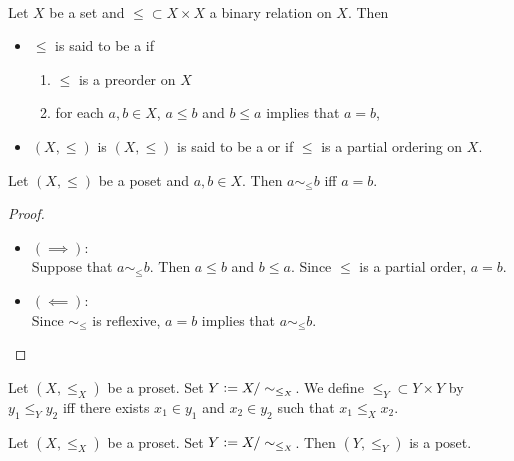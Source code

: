 \documentclass{book}
\begin{document}
	\begin{defn}   \\
		Let $X$ be a set and ${\leq}  \subset X \times X$ a binary relation on $X$. Then 
		\begin{itemize}
			\item $\leq$ is said to be a  if 
			\begin{enumerate}
				\item $\leq$ is a preorder on $X$
				\item for each $a,b \in X$, $a \leq b$ and $b \leq a$ implies that $a = b$,
			\end{enumerate}
			\item $(X, \leq)$ is $(X, \leq)$ is said to be a  or  if
			$\leq$ is a partial ordering on $X$.
		\end{itemize}
	\end{defn}
	
	\begin{ex} 
		Let $(X, \leq)$ be a poset and $a,b \in X$. Then $a \sim_{\leq} b$ iff $a = b$. 
	\end{ex}
	
	\begin{proof}\
		\begin{itemize}
			\item $(\implies)$: \\
			Suppose that $a \sim_{\leq} b$. Then $a \leq b$ and $b \leq a$. Since $\leq$ is a partial order, $a = b$. 
			\item $(\impliedby)$: \\
			Since $\sim_{\leq}$ is reflexive, $a = b$ implies that $a \sim_{\leq} b$. 
		\end{itemize}
	\end{proof}
	
	\begin{defn} 
		Let $(X, \leq_X)$ be a proset. Set $Y \vcentcolon= X /\sim_{\leq_X}$. We define $\leq_Y \subset Y \times Y$ by $y_1 \leq_Y y_2$ iff there exists $x_1 \in y_1$ and $x_2 \in y_2$ such that $x_1 \leq_X x_2$.
	\end{defn}
	
	\begin{ex} 
		Let $(X, \leq_X)$ be a proset. Set $Y \vcentcolon= X /\sim_{\leq_X}$. Then $(Y, \leq_Y)$ is a poset. 
	\end{ex}
	
\end{document}
